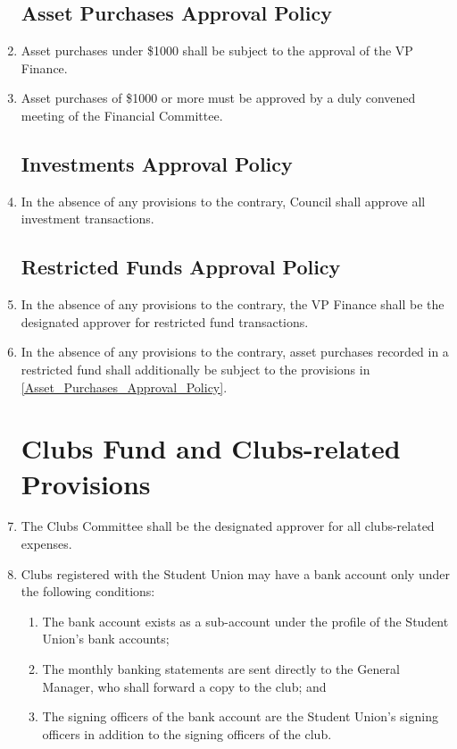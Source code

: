 \documentclass[oneside]{book}
\begin{document}
\begin{enumerate}
\section{\label{Asset_Purchases_Approval_Policy}Asset Purchases Approval Policy}
\item Asset purchases under \$1000 shall be subject to the approval of the VP Finance.
\item Asset purchases of \$1000 or more must be approved by a duly convened meeting of the Financial Committee.
\section{\label{Investments_Approval_Policy}Investments Approval Policy}
\item In the absence of any provisions to the contrary, Council shall approve all investment transactions.
\section{\label{Restricted_Funds_Approval_Policy}Restricted Funds Approval Policy}

\item In the absence of any provisions to the contrary, the VP Finance shall be the designated approver for restricted fund transactions. 
\item In the absence of any provisions to the contrary, asset purchases recorded in a restricted fund shall additionally be subject to the provisions in \autoref{Asset_Purchases_Approval_Policy}.

\chapter{\label{Clubs_Fund_and_Clubs-related_Provisions}Clubs Fund and Clubs-related Provisions}

\item The Clubs Committee shall be the designated approver for all clubs-related expenses. 
\item Clubs registered with the Student Union may have a bank account only under the following
conditions: 

\begin{enumerate}
\item The bank account exists as a sub-account under the profile of the Student Union's bank accounts; 
\item The monthly banking statements are sent directly to the General Manager, who shall forward a copy to the club; and
\item The signing officers of the bank account are the Student Union’s signing officers in addition to the signing officers of the club.
\end{enumerate}


\end{enumerate}
\end{document}
